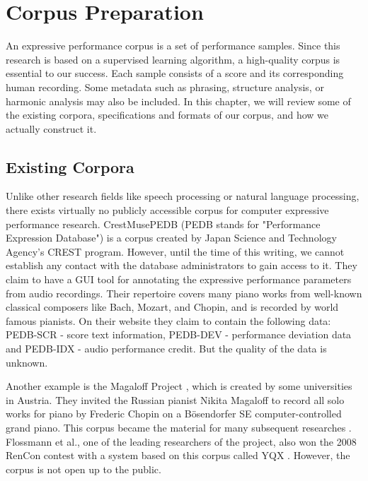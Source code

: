 \chapter{Corpus Preparation}
\label{chap:corpus}
  An expressive performance corpus is a set of performance samples. Since this research is based on a supervised learning algorithm, a high-quality corpus is essential to our success. Each sample consists of a score and its corresponding human recording. Some metadata such as phrasing, structure analysis, or harmonic analysis may also be included. In this chapter, we will review some of the existing corpora, specifications and formats of our corpus, and how we actually construct it.

\section{Existing Corpora} 
Unlike other research fields like speech processing or natural language processing, there exists virtually no publicly accessible corpus for computer expressive performance research. CrestMusePEDB \cite{crestmuse} (PEDB stands for "Performance Expression Database") is a corpus created by Japan Science and Technology Agency's CREST program. However, until the time of this writing, we cannot establish any contact with the database administrators to gain access to it. They claim to have a GUI tool for annotating the expressive performance parameters from audio recordings. Their repertoire covers many piano works from well-known classical composers like Bach, Mozart, and Chopin, and is recorded by world famous pianists. On their website \cite{crestmuse} they claim to contain the following data: PEDB-SCR - score text information, PEDB-DEV - performance deviation data and PEDB-IDX - audio performance credit. But the quality of the data is unknown.

Another example is the Magaloff Project \cite{magaloff}, which is created by some universities in Austria. They invited the Russian pianist Nikita Magaloff to record all solo works for piano by Frederic Chopin on a Bösendorfer SE computer-controlled grand piano. This corpus became the material for many subsequent researches \cite{Goebl2009, Grachten2011, Flossmann2009, Grachten2012, Flossmann2013, Flossman2011, Flossmann2010a}. Flossmann et al., one of the leading researchers of the project, also won the 2008 RenCon contest with a system based on this corpus called YQX \cite{yqx}. However, the corpus is not open up to the public. 


